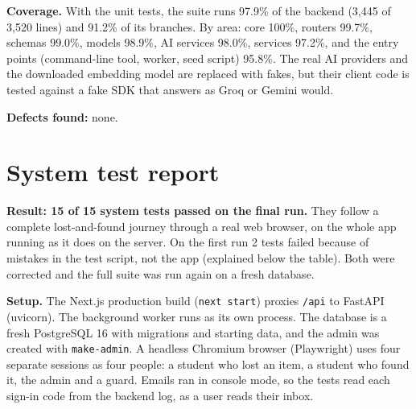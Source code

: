 \textbf{Coverage.} With the unit tests, the suite runs 97.9\% of the backend (3,445 of 3,520 lines) and 91.2\% of its branches. By area: core 100\%, routers 99.7\%, schemas 99.0\%, models 98.9\%, AI services 98.0\%, services 97.2\%, and the entry points (command-line tool, worker, seed script) 95.8\%. The real AI providers and the downloaded embedding model are replaced with fakes, but their client code is tested against a fake SDK that answers as Groq or Gemini would.

\textbf{Defects found:} none.

\section{System test report}

\textbf{Result: 15 of 15 system tests passed on the final run.} They follow a complete lost-and-found journey through a real web browser, on the whole app running as it does on the server. On the first run 2 tests failed because of mistakes in the test script, not the app (explained below the table). Both were corrected and the full suite was run again on a fresh database.

\textbf{Setup.} The Next.js production build (\texttt{next start}) proxies \texttt{/\allowbreak{}api} to FastAPI (uvicorn). The background worker runs as its own process. The database is a fresh PostgreSQL 16 with migrations and starting data, and the admin was created with \texttt{make-\allowbreak{}admin}. A headless Chromium browser (Playwright) uses four separate sessions as four people: a student who lost an item, a student who found it, the admin and a guard. Emails ran in console mode, so the tests read each sign-in code from the backend log, as a user reads their inbox.

